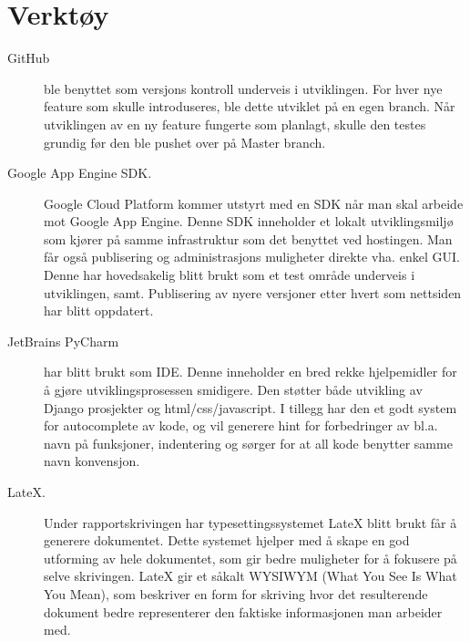 \section{Verktøy}
\begin{description}
\item[GitHub]ble benyttet som versjons kontroll underveis i utviklingen. For hver nye feature som skulle introduseres, ble dette utviklet på en egen branch. Når utviklingen av en ny feature fungerte som planlagt, skulle den testes grundig før den ble pushet over på Master branch.
\item[Google App Engine SDK.] Google Cloud Platform kommer utstyrt med en SDK når man skal arbeide mot Google App Engine. Denne SDK inneholder et lokalt utviklingsmiljø som kjører på samme infrastruktur som det benyttet ved hostingen. Man får også publisering og administrasjons muligheter direkte vha. enkel GUI. Denne har hovedsakelig blitt brukt som et test område underveis i utviklingen, samt. Publisering av nyere versjoner etter hvert som nettsiden har blitt oppdatert.
\item[JetBrains PyCharm] har blitt brukt som IDE. Denne inneholder en bred rekke hjelpemidler for å gjøre utviklingsprosessen smidigere. Den støtter både utvikling av Django prosjekter og html/css/javascript. I tillegg har den et godt system for autocomplete av kode, og vil generere hint for forbedringer av bl.a. navn på funksjoner, indentering og sørger for at all kode benytter samme navn konvensjon.
\item[LateX.]Under rapportskrivingen har typesettingssystemet LateX blitt brukt får å generere dokumentet. Dette systemet hjelper med å skape en god utforming av hele dokumentet, som gir bedre muligheter for å fokusere på selve skrivingen. LateX gir et såkalt WYSIWYM (What You See Is What You Mean), som beskriver en form for skriving hvor det resulterende dokument bedre representerer den faktiske informasjonen man arbeider med.



\end{description}

